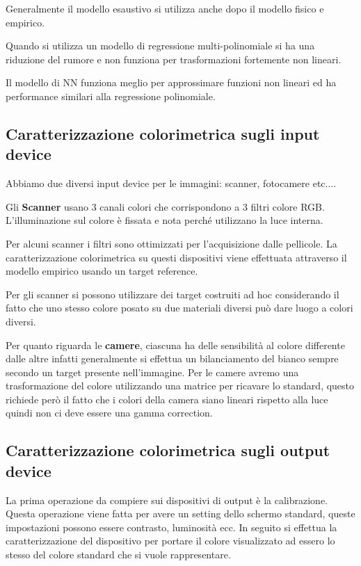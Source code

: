 Generalmente il modello esaustivo si utilizza anche dopo il modello fisico e empirico.
\begin{nota}
    Quando si utilizza un modello di regressione multi-polinomiale si ha una
    riduzione del rumore e non funziona per trasformazioni fortemente non lineari.
\end{nota}
\begin{nota}
    Il modello di NN funziona meglio per approssimare funzioni non lineari ed ha
    performance similari alla regressione polinomiale.
\end{nota}
\subsection{Caratterizzazione colorimetrica sugli input device}
Abbiamo due diversi input device per le immagini: scanner, fotocamere etc$\dots$.

Gli \textbf{Scanner} usano $3$ canali colori che corrispondono a 3 filtri colore
RGB. L'illuminazione sul colore è fissata e nota perché utilizzano la luce interna.

Per alcuni scanner i filtri sono ottimizzati per l'acquisizione dalle pellicole.
La caratterizzazione colorimetrica su questi dispositivi viene effettuata attraverso
il modello empirico usando un target reference.

Per gli scanner si possono utilizzare dei target costruiti ad hoc considerando il
fatto che uno stesso colore posato su due materiali diversi può dare luogo a colori
diversi.

Per quanto riguarda le \textbf{camere}, ciascuna ha delle sensibilità al colore
differente dalle altre infatti generalmente si effettua un bilanciamento del bianco
sempre secondo un target presente nell'immagine. Per le camere avremo una
trasformazione del colore utilizzando una matrice per ricavare lo standard, questo
richiede però il fatto che i colori della camera siano lineari rispetto alla luce
quindi non ci deve essere una gamma correction.

\subsection{Caratterizzazione colorimetrica sugli output device}
La prima operazione da compiere sui dispositivi di output è la calibrazione.
Questa operazione viene fatta per avere un setting dello schermo standard,
queste impostazioni possono essere contrasto, luminosità ecc. In seguito
si effettua la caratterizzazione del dispositivo per portare il colore visualizzato
ad essero lo stesso del colore standard che si vuole rappresentare.

